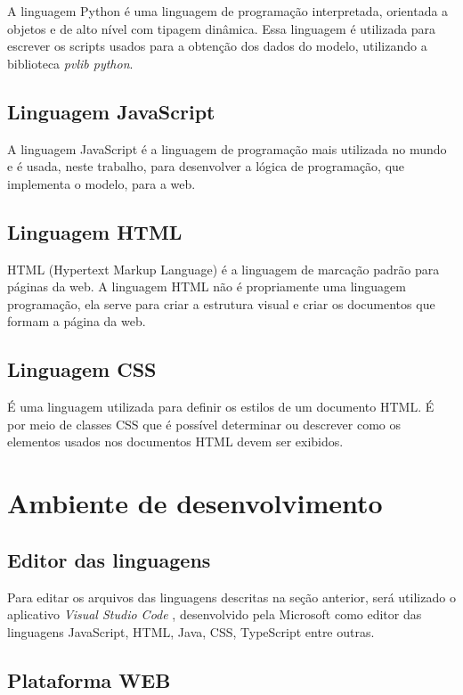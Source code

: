 A linguagem Python é uma linguagem de programação interpretada, orientada a objetos e de alto nível com tipagem dinâmica. Essa linguagem é utilizada para escrever os scripts usados para a obtenção dos dados do modelo, utilizando a biblioteca \textit{pvlib python}.

\subsection{Linguagem JavaScript}

A linguagem JavaScript é a linguagem de programação mais utilizada no mundo e é usada, neste trabalho, para desenvolver a lógica de programação, que implementa o modelo, para a web.

\subsection{Linguagem HTML}

HTML (Hypertext Markup Language) é a linguagem de marcação padrão para páginas da web. A linguagem HTML não é propriamente uma linguagem programação, ela serve para criar a estrutura visual e criar os documentos que formam a página da web.

\subsection{Linguagem CSS}

É uma linguagem utilizada para definir os estilos de um documento HTML. É por meio de classes CSS que é possível determinar ou descrever como os elementos usados nos documentos HTML devem ser exibidos.

\section{Ambiente de desenvolvimento}

\subsection{Editor das linguagens}

Para editar os arquivos das linguagens descritas na seção anterior, será utilizado o aplicativo \textit{Visual Studio Code} \cite{vs}, desenvolvido pela Microsoft como editor das linguagens JavaScript, HTML, Java, CSS, TypeScript entre outras.

\subsection{Plataforma WEB}

